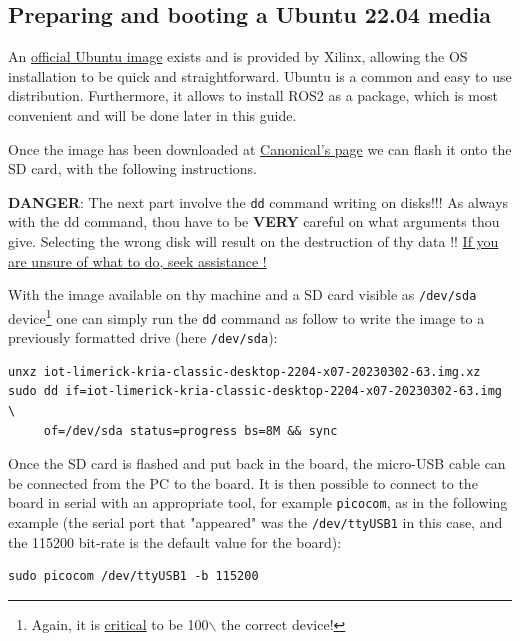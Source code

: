 \documentclass[10pt]{article}
\begin{document}
\subsection{Preparing and booting a Ubuntu 22.04 media}
\label{sec:org635e235}
An \href{https://ubuntu.com/download/amd-xilinx}{official Ubuntu image} exists and is
provided by Xilinx, allowing the OS installation to be quick and
straightforward.
Ubuntu is a common and easy to use distribution. Furthermore,
it allows to install ROS2 as a package, which is most convenient and will be
done later in this guide.

Once the image has been downloaded at \href{https://ubuntu.com/download/amd-xilinx}{Canonical's page}
we can flash it onto the SD card, with the following instructions.

\begin{tcolorbox}[colback=red!5!white,colframe=red!75!black]
\textbf{DANGER}: The next part involve the \texttt{dd} command writing on disks!!!
As always with the dd command, thou have to be \textbf{VERY} careful on what arguments
thou give. Selecting the wrong disk will result on the destruction of
thy data !!
\uline{If you are unsure of what to do, seek assistance !}
\end{tcolorbox}

With the image available on thy machine and a SD card visible as \texttt{/dev/sda} device\footnote{Again, it is \uline{critical} to be 100$\backslash$%
the correct device!}
one can simply run the \texttt{dd} command as follow to write the image to a previously formatted drive (here \texttt{/dev/sda}):

\begin{verbatim}
unxz iot-limerick-kria-classic-desktop-2204-x07-20230302-63.img.xz
sudo dd if=iot-limerick-kria-classic-desktop-2204-x07-20230302-63.img \
     of=/dev/sda status=progress bs=8M && sync
\end{verbatim}


Once the SD card is flashed and put back in the board, the micro-USB cable can be
connected from the PC to the board. It is then possible to
connect to the board in serial with an appropriate tool, for example \texttt{picocom},
as in the following example (the serial port that "appeared" was the \texttt{/dev/ttyUSB1} in this case,
and the 115200 bit-rate is the default value for the board):

\begin{verbatim}
sudo picocom /dev/ttyUSB1 -b 115200
\end{verbatim}
\end{document}
